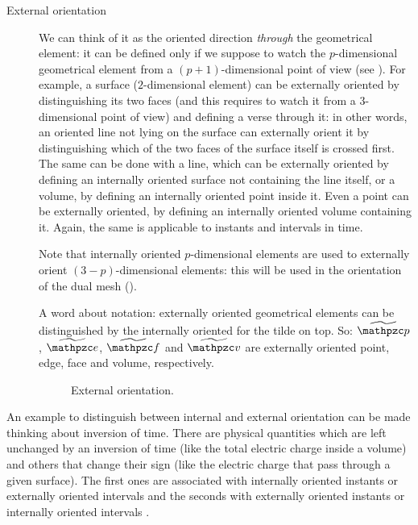 \begin{description}
\item[External orientation] We can think of it as the oriented
  direction \emph{through} the geometrical element: it can be defined
  only if we suppose to watch the $p$-dimensional geometrical element
  from a $(p+1)$-dimensional point of view (see
  ). For example, a surface
  ($2$-dimensional element) can be externally oriented by
  distinguishing its two faces (and this requires to watch it from a
  $3$-dimensional point of view) and defining a verse through it: in
  other words, an oriented line not lying on the surface can
  externally orient it by distinguishing which of the two faces of the
  surface itself is crossed first. The same can be done with a line,
  which can be externally oriented by defining an internally oriented
  surface not containing the line itself, or a volume, by defining an
  internally oriented point inside it. Even a point can be
  externally oriented, by defining an internally oriented volume
  containing it. Again, the same is applicable to instants and
  intervals in time.

  Note that internally oriented $p$-dimensional elements are used to externally orient
  $(3-p)$-dimensional elements: this will be used in the orientation
  of the dual mesh ().
  
  A word about notation: externally oriented geometrical elements can
  be distinguished by the internally oriented for the tilde on top. So:
  $\ExtOrient{\Point{p}}$, $\ExtOrient{\Line{e}}$, $\ExtOrient{\Surface{f}}$ and
  $\ExtOrient{\Volume{v}}$ are externally oriented point, edge, face and
  volume, respectively.

  \begin{figure}[htbp]
    \begin{center}
      \subfigure[Point]{\resizebox{4cm}{!}{}}
      \subfigure[Line]{\resizebox{4cm}{!}{}}
      \subfigure[Face]{\resizebox{4cm}{!}{}}
      \subfigure[Volume]{\resizebox{4cm}{!}{}}
  \end{center}
    \caption{External orientation.}
    \label{fig:external_orientation}
  \end{figure}

\end{description}

An example to distinguish between internal and external orientation can be
made thinking about inversion of time. There are physical quantities
which are left unchanged by an inversion of time (like the total
electric charge inside a volume) and others that change their sign
(like the electric charge that pass through a given surface). The
first ones are associated with internally oriented instants or
externally oriented intervals and the seconds with externally oriented
instants or internally oriented intervals \cite{tonti_formulazione}.

